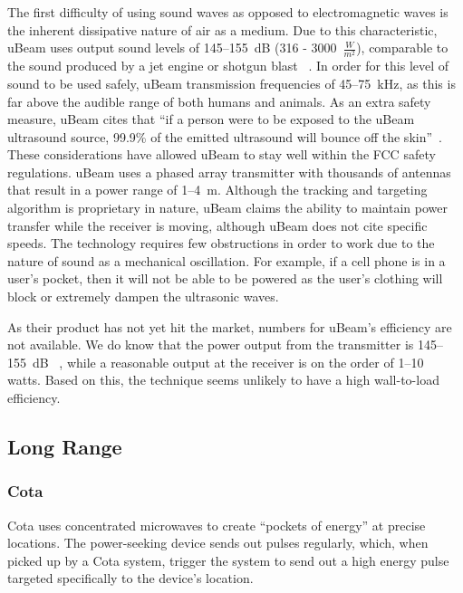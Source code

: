 The first difficulty of using sound waves as opposed  to electromagnetic waves is the inherent dissipative nature of air as a medium. Due to this characteristic, uBeam uses output sound levels of \numrange{145}{155}~dB (316 - 3000~$\frac{W}{m^2}$), comparable to the sound produced by a jet engine or shotgun blast ~\cite{galencarolaudio207}. In order for this level of sound to be used safely, uBeam transmission frequencies of \numrange{45}{75}~kHz, as this is far above the audible range of both humans and animals. As an extra safety measure, uBeam cites that ``if a person were to be exposed to the uBeam ultrasound source, 99.9\% of the emitted ultrasound will bounce off the skin''~\cite{constine_ubeam_2015}. These considerations have allowed uBeam to stay well within the FCC safety regulations.
uBeam uses a phased array transmitter with thousands of antennas that result in a power range of \numrange{1}{4}~m. Although the tracking and targeting algorithm is proprietary in nature, uBeam claims the ability to maintain power transfer while the receiver is moving, although uBeam does not cite specific speeds. The technology requires few obstructions in order to work due to the nature of sound as a mechanical oscillation. For example, if a cell phone is in a user's pocket, then it will not be able to be powered as the user's clothing will block or extremely dampen the ultrasonic waves.

As their product has not yet hit the market, numbers for uBeam's efficiency are not available. We do know that the power output from the transmitter is \numrange{145}{155}~dB ~\cite{constine_ubeam_2015}, while a reasonable output at the receiver is on the order of \numrange{1}{10}~ watts. Based on this, the technique seems unlikely to have a high wall-to-load efficiency.

\subsection{Long Range}

\subsubsection{Cota}

Cota uses concentrated microwaves to create ``pockets of energy'' at precise locations. The power-seeking device sends out pulses regularly, which, when picked up by a Cota system, trigger the system to send out a high energy pulse targeted specifically to the device's location.

